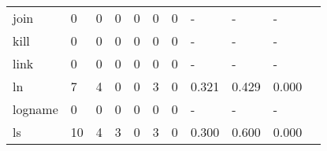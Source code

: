 \begin{longtable}{lp{1.2cm}p{1.2cm}p{1.2cm}p{1.2cm}p{1.2cm}p{1.2cm}p{1.2cm}p{1.2cm}p{1.2cm}p{1.2cm}}
join      &                                     0 &                                                  0 &                                                0 &                                               0 &                                                0 &                                              0 &                                             - &                                                  - &                                                  - \\
kill      &                                     0 &                                                  0 &                                                0 &                                               0 &                                                0 &                                              0 &                                             - &                                                  - &                                                  - \\
link      &                                     0 &                                                  0 &                                                0 &                                               0 &                                                0 &                                              0 &                                             - &                                                  - &                                                  - \\
ln        &                                     7 &                                                  4 &                                                0 &                                               0 &                                                3 &                                              0 &                                         0.321 &                                              0.429 &                                              0.000 \\
logname   &                                     0 &                                                  0 &                                                0 &                                               0 &                                                0 &                                              0 &                                             - &                                                  - &                                                  - \\
ls        &                                    10 &                                                  4 &                                                3 &                                               0 &                                                3 &                                              0 &                                         0.300 &                                              0.600 &                                              0.000 \\

\end{longtable}
